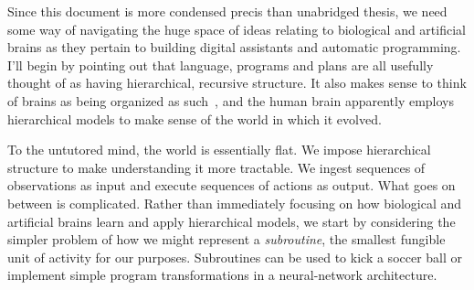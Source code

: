 Since this document is more condensed precis than unabridged thesis, we need some way of navigating the huge space of ideas relating to biological and artificial brains as they pertain to building digital assistants and automatic programming. I'll begin by pointing out that language, programs and plans are all usefully thought of as having hierarchical, recursive structure. It also makes sense to think of brains as being organized as such~\cite{Ballard2015,Kurzweil2012,DeanAMAI-06,GeorgeandHawkinsIJCNN-05,DeanAAAI-05,Hawkins04}, and the human brain apparently employs hierarchical models to make sense of the world in which it evolved. 

To the untutored mind, the world is essentially flat. We impose hierarchical structure to make understanding it more tractable. We ingest sequences of observations as input and execute sequences of actions as output. What goes on between is complicated. Rather than immediately focusing on how biological and artificial brains learn and apply hierarchical models, we start by considering the simpler problem of how we might represent a {\it{subroutine}}, the smallest fungible unit of activity for our purposes. Subroutines can be used to kick a soccer ball or implement simple program transformations in a neural-network architecture.


